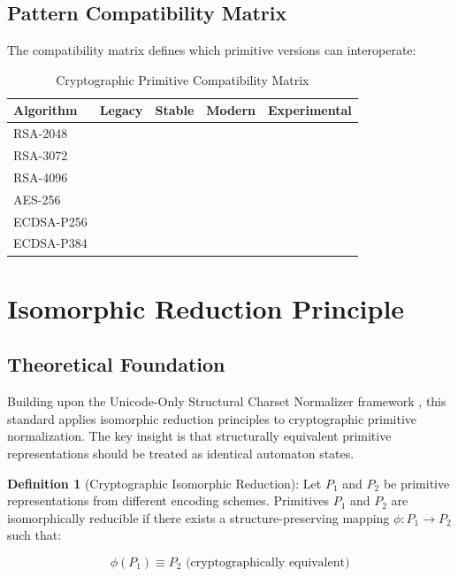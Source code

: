 \documentclass[11pt,a4paper]{article}
\newcommand{\cmark}{\ding{51}}
\newcommand{\xmark}{\ding{55}}
\begin{document}
\subsection{Pattern Compatibility Matrix}

The compatibility matrix defines which primitive versions can interoperate:

\begin{table}[h]
\centering
\begin{tabular}{|l|c|c|c|c|}
\hline
\textbf{Algorithm} & \textbf{Legacy} & \textbf{Stable} & \textbf{Modern} & \textbf{Experimental} \\
\hline
RSA-2048 & \cmark & \cmark & \cmark & \xmark \\
RSA-3072 & \cmark & \cmark & \cmark & \cmark \\
RSA-4096 & \xmark & \cmark & \cmark & \cmark \\
AES-256 & \cmark & \cmark & \cmark & \cmark \\
ECDSA-P256 & \cmark & \cmark & \cmark & \xmark \\
ECDSA-P384 & \xmark & \cmark & \cmark & \cmark \\
\hline
\end{tabular}
\caption{Cryptographic Primitive Compatibility Matrix}
\end{table}

\section{Isomorphic Reduction Principle}

\subsection{Theoretical Foundation}

Building upon the Unicode-Only Structural Charset Normalizer framework \cite{okpala2025isomorphic}, this standard applies isomorphic reduction principles to cryptographic primitive normalization. The key insight is that structurally equivalent primitive representations should be treated as identical automaton states.

\textbf{Definition 1} (Cryptographic Isomorphic Reduction): Let $P_1$ and $P_2$ be primitive representations from different encoding schemes. Primitives $P_1$ and $P_2$ are isomorphically reducible if there exists a structure-preserving mapping $\phi : P_1 \rightarrow P_2$ such that:

$$\phi(P_1) \equiv P_2 \text{ (cryptographically equivalent)}$$
\end{document}
